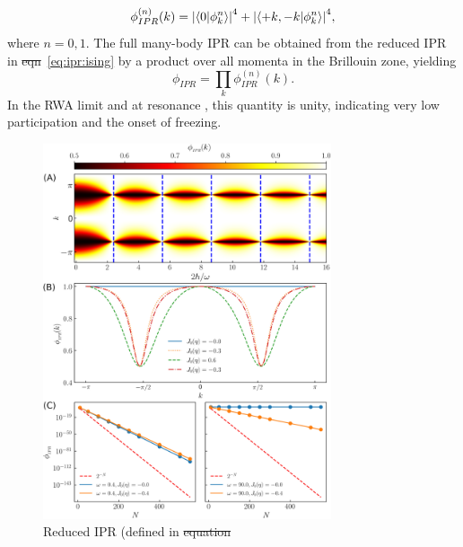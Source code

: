 \documentclass[%
reprint,
superscriptaddress,
amsmath,amssymb,
aps,
prb,
showkeys,
]{revtex4-2}
\providecommand{\DIFaddtex}[1]{{\protect\color{blue}\uwave{#1}}} %
\providecommand{\DIFdeltex}[1]{{\protect\color{red}\sout{#1}}}                      %
\providecommand{\DIFaddbegin}{} %
\providecommand{\DIFaddend}{} %
\providecommand{\DIFdelbegin}{} %
\providecommand{\DIFdelend}{} %
\providecommand{\DIFdelFL}[1]{\DIFdel{#1}} %
\providecommand{\DIFaddbeginFL}{} %
\providecommand{\DIFaddendFL}{} %
\providecommand{\DIFdelbeginFL}{} %
\providecommand{\DIFdelendFL}{} %
\providecommand{\DIFadd}[1]{\texorpdfstring{\DIFaddtex{#1}}{#1}} %
\providecommand{\DIFdel}[1]{\texorpdfstring{\DIFdeltex{#1}}{}} %
\newcommand{\DIFscaledelfig}{0.5}
\newlength{\DIFdelgraphicswidth} %
\newlength{\DIFdelgraphicsheight} %
\newcommand{\DIFaddincludegraphics}[2][]{{\color{blue}\fbox{\DIFOincludegraphics[#1]{#2}}}} %
\newcommand{\DIFdelincludegraphics}[2][]{%
\sbox{\DIFdelgraphicsbox}{\DIFOincludegraphics[#1]{#2}}%
\settoboxwidth{\DIFdelgraphicswidth}{\DIFdelgraphicsbox} %
\settoboxtotalheight{\DIFdelgraphicsheight}{\DIFdelgraphicsbox} %
\scalebox{\DIFscaledelfig}{%
\parbox[b]{\DIFdelgraphicswidth}{\usebox{\DIFdelgraphicsbox}\\[-\baselineskip] \rule{\DIFdelgraphicswidth}{0em}}\llap{\resizebox{\DIFdelgraphicswidth}{\DIFdelgraphicsheight}{%
\setlength{\unitlength}{\DIFdelgraphicswidth}%
\begin{picture}(1,1)%
\thicklines\linethickness{2pt} %
{\color[rgb]{1,0,0}\put(0,0){\framebox(1,1){}}}%
{\color[rgb]{1,0,0}\put(0,0){\line( 1,1){1}}}%
{\color[rgb]{1,0,0}\put(0,1){\line(1,-1){1}}}%
\end{picture}%
}\hspace*{3pt}}} %
} %
\DeclareRobustCommand{\DIFaddbegin}{\DIFOaddbegin \let\includegraphics\DIFaddincludegraphics} %
\DeclareRobustCommand{\DIFaddend}{\DIFOaddend \let\includegraphics\DIFOincludegraphics} %
\DeclareRobustCommand{\DIFdelbegin}{\DIFOdelbegin \let\includegraphics\DIFdelincludegraphics} %
\DeclareRobustCommand{\DIFdelend}{\DIFOaddend \let\includegraphics\DIFOincludegraphics} %
\DeclareRobustCommand{\DIFaddbeginFL}{\DIFOaddbeginFL \let\includegraphics\DIFaddincludegraphics} %
\DeclareRobustCommand{\DIFaddendFL}{\DIFOaddendFL \let\includegraphics\DIFOincludegraphics} %
\DeclareRobustCommand{\DIFdelbeginFL}{\DIFOdelbeginFL \let\includegraphics\DIFdelincludegraphics} %
\DeclareRobustCommand{\DIFdelendFL}{\DIFOaddendFL \let\includegraphics\DIFOincludegraphics} %
\begin{document}
\begin{equation}
	\label{eq:ipr:ising}
	\phi^{(n)}_{IPR}(k) = \abs{\ip{0}{\phi^n_k}}^4 + \abs{\ip{ +k, -k }{\phi^n_k}}^4,
\end{equation}
where $n=0,1$. {The full many-body IPR can be obtained from the reduced IPR in \DIFdelbegin \DIFdel{eqn}\DIFdelend \DIFaddbegin \DIFadd{eq.}\DIFaddend }~\ref{eq:ipr:ising} {by a product over all momenta in the Brillouin zone, yielding}
\begin{equation}
	\label{eq:ipr:manybody}
	\phi_{IPR} = \prod_k \phi^{(n)}_{IPR}(k).
\end{equation}
In the RWA limit and at resonance , this quantity is unity, indicating very low participation and the onset of freezing.
\begin{figure}[t!]
	\centering
	\DIFdelbeginFL %
\DIFdelendFL \DIFaddbeginFL \includegraphics[width = 8.5cm]{figure_2.jpeg}
	\DIFaddendFL \caption{\DIFdelbeginFL %
\DIFdelendFL Reduced IPR (defined in \DIFdelbeginFL \DIFdelFL{equation}%
}
\end{figure}
\end{document}
